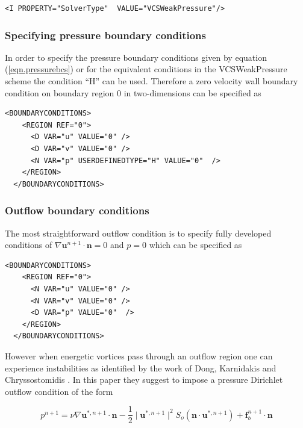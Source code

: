 \begin{lstlisting}[style=XMLStyle]
<I PROPERTY="SolverType"  VALUE="VCSWeakPressure"/>
\end{lstlisting}

\subsubsection{Specifying pressure boundary conditions}

In order to specify the pressure boundary conditions given by equation
(\ref{eqn.pressurebcs}) or for the equivalent conditions in the VCSWeakPressure
scheme the  condition ``H'' can be
used. Therefore a zero velocity wall boundary condition on boundary
region 0 in two-dimensions can be specified as

\begin{lstlisting}[style=XMLStyle]
  <BOUNDARYCONDITIONS>
    <REGION REF="0">
      <D VAR="u" VALUE="0" />
      <D VAR="v" VALUE="0" />
      <N VAR="p" USERDEFINEDTYPE="H" VALUE="0"  />
    </REGION>
  </BOUNDARYCONDITIONS>
\end{lstlisting}


\subsubsection{Outflow boundary conditions}

The most straightforward outflow condition is to specify fully
developed conditions of $\nabla\mathbf{u}^{n+1}\cdot \mathbf{n}=0$ and
$p=0$ which can be specified as 

\begin{lstlisting}[style=XMLStyle]
  <BOUNDARYCONDITIONS>
    <REGION REF="0">
      <N VAR="u" VALUE="0" />
      <N VAR="v" VALUE="0" />
      <D VAR="p" VALUE="0"  />
    </REGION>
  </BOUNDARYCONDITIONS>
\end{lstlisting}

However when energetic vortices pass through an outflow region one can
experience instabilities as identified by the work of Dong, Karnidakis
and Chryssostomidis \cite{DoKa14}. In this paper they suggest to
impose a pressure Dirichlet outflow condition of the form

\begin{equation}
 p^{n+1}= \nu \nabla\mathbf{u}^{*,n+1}\cdot \mathbf{n}-\frac{1}{2}
 \mid \mathbf{u}^{*,n+1} \mid^2 S_o(\mathbf{n}\cdot
 \mathbf{u}^{*,n+1})+\mathbf{f}_b^{n+1}\cdot \mathbf{n}
\end{equation}

